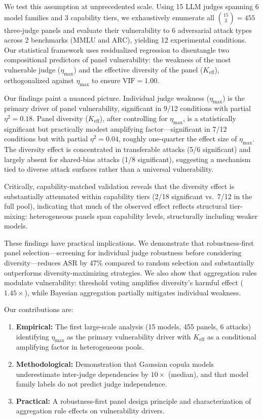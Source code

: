 \documentclass[11pt,a4paper]{article}
\newcommand{\keff}{K_{\text{eff}}}
\newcommand{\etamax}{\eta_{\max}}
\begin{document}
We test this assumption at unprecedented scale. Using 15 LLM judges spanning 6 model families and 3 capability tiers, we exhaustively enumerate all $\binom{15}{3} = 455$ three-judge panels and evaluate their vulnerability to 6 adversarial attack types across 2 benchmarks (MMLU and ARC), yielding 12 experimental conditions. Our statistical framework uses residualized regression to disentangle two compositional predictors of panel vulnerability: the weakness of the most vulnerable judge ($\etamax$) and the effective diversity of the panel ($\keff$), orthogonalized against $\etamax$ to ensure $\text{VIF} = 1.00$.

Our findings paint a nuanced picture. Individual judge weakness ($\etamax$) is the primary driver of panel vulnerability, significant in 9/12 conditions with partial $\eta^2 = 0.18$. Panel diversity ($\keff$), after controlling for $\etamax$, is a statistically significant but practically modest amplifying factor---significant in 7/12 conditions but with partial $\eta^2 = 0.04$, roughly one-quarter the effect size of $\etamax$. The diversity effect is concentrated in transferable attacks (5/6 significant) and largely absent for shared-bias attacks (1/8 significant), suggesting a mechanism tied to diverse attack surfaces rather than a universal vulnerability.

Critically, capability-matched validation reveals that the diversity effect is substantially attenuated within capability tiers (2/18 significant vs.\ 7/12 in the full pool), indicating that much of the observed effect reflects structural tier-mixing: heterogeneous panels span capability levels, structurally including weaker models.

These findings have practical implications. We demonstrate that robustness-first panel selection---screening for individual judge robustness before considering diversity---reduces ASR by 47\% compared to random selection and substantially outperforms diversity-maximizing strategies. We also show that aggregation rules modulate vulnerability: threshold voting amplifies diversity's harmful effect ($1.45\times$), while Bayesian aggregation partially mitigates individual weakness.

Our contributions are:
\begin{enumerate}[topsep=2pt, itemsep=1pt, leftmargin=2em]
    \item \textbf{Empirical:} The first large-scale analysis (15 models, 455 panels, 6 attacks) identifying $\etamax$ as the primary vulnerability driver with $\keff$ as a conditional amplifying factor in heterogeneous pools.
    \item \textbf{Methodological:} Demonstration that Gaussian copula models underestimate inter-judge dependencies by $10\times$ (median), and that model family labels do not predict judge independence.
    \item \textbf{Practical:} A robustness-first panel design principle and characterization of aggregation rule effects on vulnerability drivers.
\end{enumerate}
\end{document}
